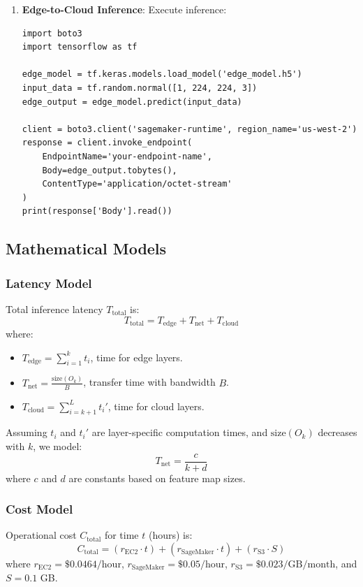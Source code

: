 \documentclass[conference]{IEEEtran}
\begin{document}
\begin{enumerate}
  \item \textbf{Edge-to-Cloud Inference}: Execute inference:
  \begin{lstlisting}
import boto3
import tensorflow as tf

edge_model = tf.keras.models.load_model('edge_model.h5')
input_data = tf.random.normal([1, 224, 224, 3])
edge_output = edge_model.predict(input_data)

client = boto3.client('sagemaker-runtime', region_name='us-west-2')
response = client.invoke_endpoint(
    EndpointName='your-endpoint-name',
    Body=edge_output.tobytes(),
    ContentType='application/octet-stream'
)
print(response['Body'].read())
  \end{lstlisting}
\end{enumerate}

\subsection{Mathematical Models}
\subsubsection{Latency Model}
Total inference latency \( T_{\text{total}} \) is:
\[
T_{\text{total}} = T_{\text{edge}} + T_{\text{net}} + T_{\text{cloud}}
\]
where:
\begin{itemize}
  \item \( T_{\text{edge}} = \sum_{i=1}^{k} t_i \), time for edge layers.
  \item \( T_{\text{net}} = \frac{\text{size}(O_k)}{B} \), transfer time with bandwidth \( B \).
  \item \( T_{\text{cloud}} = \sum_{i=k+1}^{L} t_i' \), time for cloud layers.
\end{itemize}

Assuming \( t_i \) and \( t_i' \) are layer-specific computation times, and \( \text{size}(O_k) \) decreases with \( k \), we model:
\[
T_{\text{net}} = \frac{c}{k + d}
\]
where \( c \) and \( d \) are constants based on feature map sizes.

\subsubsection{Cost Model}
Operational cost \( C_{\text{total}} \) for time \( t \) (hours) is:
\[
C_{\text{total}} = (r_{\text{EC2}} \cdot t) + (r_{\text{SageMaker}} \cdot t) + (r_{\text{S3}} \cdot S)
\]
where \( r_{\text{EC2}} = \$0.0464/\text{hour} \), \( r_{\text{SageMaker}} = \$0.05/\text{hour} \), \( r_{\text{S3}} = \$0.023/\text{GB/month} \), and \( S = 0.1 \) GB.
\end{document}

